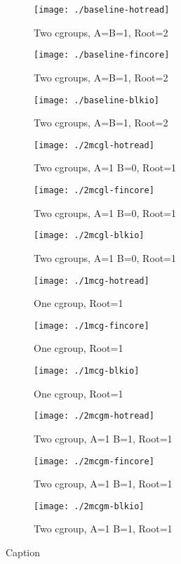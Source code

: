 \documentclass{article}
\begin{document}
\newcommand\subfigurescale{.3\textwidth}
\newcommand\widthscale{\textwidth}
\begin{figure*}
\centering
\begin{subfigure}[t]{\subfigurescale}
\centering
\texttt{[image: ./baseline-hotread]}
\caption{Two cgroups, A=B=1, Root=2}
\end{subfigure}%
\begin{subfigure}[t]{\subfigurescale}
\centering
\texttt{[image: ./baseline-fincore]}
\caption{Two cgroups, A=B=1, Root=2}
\end{subfigure}%
\begin{subfigure}[t]{\subfigurescale}
\centering
\texttt{[image: ./baseline-blkio]}
\caption{Two cgroups, A=B=1, Root=2}
\end{subfigure}
\begin{subfigure}[t]{\subfigurescale}
\centering
\texttt{[image: ./2mcgl-hotread]}
\caption{Two cgroups, A=1 B=0, Root=1}
\end{subfigure}%
\begin{subfigure}[t]{\subfigurescale}
\centering
\texttt{[image: ./2mcgl-fincore]}
\caption{Two cgroups, A=1 B=0, Root=1}
\end{subfigure}%
\begin{subfigure}[t]{\subfigurescale}
\centering
\texttt{[image: ./2mcgl-blkio]}
\caption{Two cgroups, A=1 B=0, Root=1}
\end{subfigure}
\begin{subfigure}[t]{\subfigurescale}
\centering
\texttt{[image: ./1mcg-hotread]}
\caption{One cgroup, Root=1}
\end{subfigure}%
\begin{subfigure}[t]{\subfigurescale}
\centering
\texttt{[image: ./1mcg-fincore]}
\caption{One cgroup, Root=1}
\end{subfigure}%
\begin{subfigure}[t]{\subfigurescale}
\centering
\texttt{[image: ./1mcg-blkio]}
\caption{One cgroup, Root=1}
\end{subfigure}
\begin{subfigure}[t]{\subfigurescale}
\centering
\texttt{[image: ./2mcgm-hotread]}
\caption{Two cgroup, A=1 B=1, Root=1}
\end{subfigure}%
\begin{subfigure}[t]{\subfigurescale}
\centering
\texttt{[image: ./2mcgm-fincore]}
\caption{Two cgroup, A=1 B=1, Root=1}
\end{subfigure}%
\begin{subfigure}[t]{\subfigurescale}
\centering
\texttt{[image: ./2mcgm-blkio]}
\caption{Two cgroup, A=1 B=1, Root=1}
\end{subfigure}
\caption{Caption}
\end{figure*}
\end{document}
